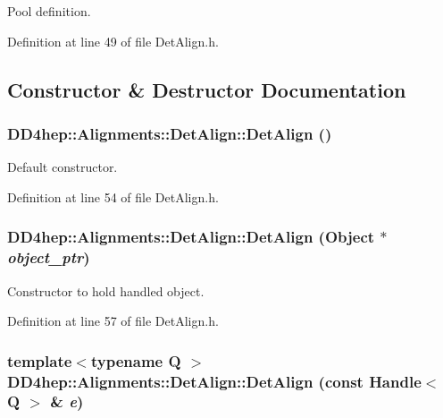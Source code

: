 Pool definition. 

Definition at line 49 of file DetAlign.h.

\subsection{Constructor \& Destructor Documentation}
\hypertarget{class_d_d4hep_1_1_alignments_1_1_det_align_a32f656225a62fa9b6b789464bfea22b3}{
\subsubsection[{DetAlign}]{\setlength{\rightskip}{0pt plus 5cm}DD4hep::Alignments::DetAlign::DetAlign ()}}
\label{class_d_d4hep_1_1_alignments_1_1_det_align_a32f656225a62fa9b6b789464bfea22b3}


Default constructor. 

Definition at line 54 of file DetAlign.h.\hypertarget{class_d_d4hep_1_1_alignments_1_1_det_align_a8b7b85c54d99bcc7e3f0535a4833780e}{
\subsubsection[{DetAlign}]{\setlength{\rightskip}{0pt plus 5cm}DD4hep::Alignments::DetAlign::DetAlign ({\bf Object} $\ast$ {\em object\_\-ptr})}}
\label{class_d_d4hep_1_1_alignments_1_1_det_align_a8b7b85c54d99bcc7e3f0535a4833780e}


Constructor to hold handled object. 

Definition at line 57 of file DetAlign.h.\hypertarget{class_d_d4hep_1_1_alignments_1_1_det_align_ae706f406dd358f2d1a717852f87cdcc1}{
\subsubsection[{DetAlign}]{\setlength{\rightskip}{0pt plus 5cm}template$<$typename Q $>$ DD4hep::Alignments::DetAlign::DetAlign (const {\bf Handle}$<$ Q $>$ \& {\em e})}}
\label{class_d_d4hep_1_1_alignments_1_1_det_align_ae706f406dd358f2d1a717852f87cdcc1}


